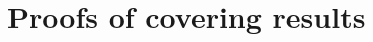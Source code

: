 \documentclass[12pt]{amsart}
\theoremstyle{definition}
\newcommand{\1}{\mathbf{1}}
\begin{document}



\section{Proofs of covering results}\label{sectionmesh}
\end{document}
